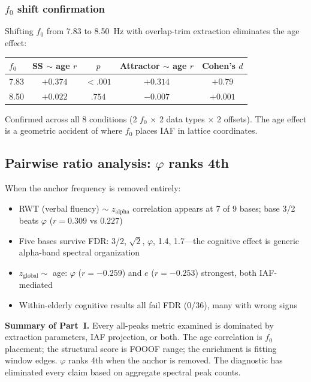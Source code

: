 \documentclass[11pt,a4paper]{article}
\newcommand{\phisym}{\varphi}
\newcommand{\fzero}{f_0}
\begin{document}
\subsubsection{$\fzero$ shift confirmation}

\begin{keyinsight}
Shifting $\fzero$ from 7.83 to 8.50~Hz with overlap-trim extraction eliminates the age effect:

\medskip
\begin{tabular}{lcccc}
\toprule
$\fzero$ & SS $\sim$ age $r$ & $p$ & Attractor $\sim$ age $r$ & Cohen's $d$ \\
\midrule
7.83 & $+0.374$ & $<.001$ & $+0.314$ & $+0.79$ \\
8.50 & $\mathbf{+0.022}$ & $\mathbf{.754}$ & $\mathbf{-0.007}$ & $\mathbf{+0.001}$ \\
\bottomrule
\end{tabular}

\medskip
\noindent Confirmed across all 8 conditions (2 $\fzero$ $\times$ 2 data types $\times$ 2 offsets). The age effect is a geometric accident of where $\fzero$ places IAF in lattice coordinates.
\end{keyinsight}

\subsection{Pairwise ratio analysis: $\phisym$ ranks 4th}

When the anchor frequency is removed entirely:
\begin{itemize}
    \item RWT (verbal fluency) $\sim$ $z_{\text{alpha}}$ correlation appears at 7 of 9 bases; base 3/2 beats $\phisym$ ($r = 0.309$ vs $0.227$)
    \item Five bases survive FDR: 3/2, $\sqrt{2}$, $\phisym$, 1.4, 1.7---the cognitive effect is generic alpha-band spectral organization
    \item $z_{\text{global}} \sim$ age: $\phisym$ ($r = -0.259$) and $e$ ($r = -0.253$) strongest, both IAF-mediated
    \item Within-elderly cognitive results all fail FDR (0/36), many with wrong signs
\end{itemize}

\begin{criticalpoint}
\textbf{Summary of Part~I.} Every all-peaks metric examined is dominated by extraction parameters, IAF projection, or both. The age correlation is $\fzero$ placement; the structural score is FOOOF range; the enrichment is fitting window edges. $\phisym$ ranks 4th when the anchor is removed. The diagnostic has eliminated every claim based on aggregate spectral peak counts.
\end{criticalpoint}
\end{document}
